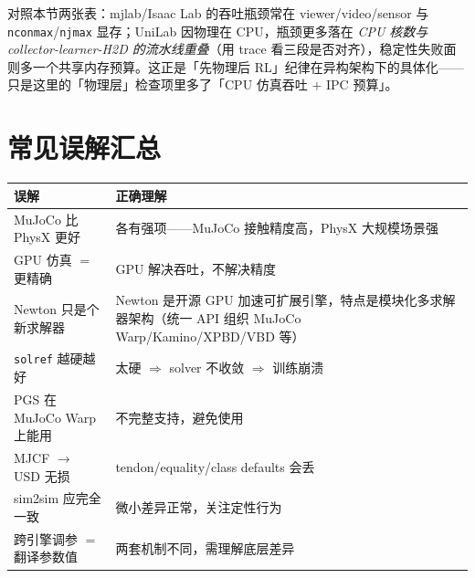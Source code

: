 \begin{note}[三框架排查重心的位移]
对照本节两张表：mjlab/Isaac Lab 的吞吐瓶颈常在 viewer/video/sensor 与 \verb|nconmax|/\allowbreak\verb|njmax| 显存；UniLab 因物理在 CPU，瓶颈更多落在 \emph{CPU 核数与 collector-learner-H2D 的流水线重叠}（用 trace 看三段是否对齐），稳定性失败面则多一个共享内存预算。这正是「先物理后 RL」纪律在异构架构下的具体化——只是这里的「物理层」检查项里多了「CPU 仿真吞吐 $+$ IPC 预算」。
\end{note}

\begin{practice}[本节练习]
\end{practice}

\section*{常见误解汇总}
\label{sec:rlmc-phys-myths}

\begin{center}
\small
\begin{tabular}{@{}p{5.2cm}p{7.2cm}@{}}
\toprule
误解 & 正确理解 \\
\midrule
MuJoCo 比 PhysX 更好 & 各有强项——MuJoCo 接触精度高，PhysX 大规模场景强 \\
GPU 仿真 $=$ 更精确 & GPU 解决吞吐，不解决精度 \\
Newton 只是个新求解器 & Newton 是开源 GPU 加速可扩展引擎，特点是模块化多求解器架构（统一 API 组织 MuJoCo Warp/Kamino/XPBD/VBD 等） \\
\verb|solref| 越硬越好 & 太硬 $\Rightarrow$ solver 不收敛 $\Rightarrow$ 训练崩溃 \\
PGS 在 MuJoCo Warp 上能用 & 不完整支持，避免使用 \\
MJCF $\to$ USD 无损 & tendon/equality/class defaults 会丢 \\
sim2sim 应完全一致 & 微小差异正常，关注定性行为 \\
跨引擎调参 $=$ 翻译参数值 & 两套机制不同，需理解底层差异 \\
\bottomrule
\end{tabular}
\end{center}


